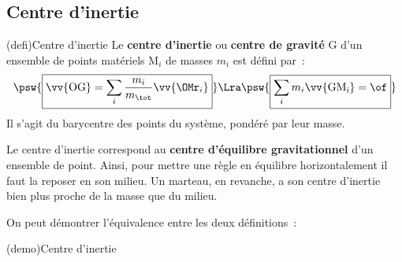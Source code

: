 \documentclass[../../main/main.tex]{subfiles}
\begin{document}
\subsection{Centre d'inertie}

\begin{tcb*}(defi){Centre d'inertie}
	Le \textbf{centre d'inertie} ou \textbf{centre de gravité} G d'un ensemble
	de points matériels M$_i$ de masses $m_i$ est défini par~:
	\[
		\psw{
			\boxed{\vv{\rm OG} = \sum_i \frac{m_i}{m_{\tot}} \vv{{\OMr}_i}}
		}
		\Lra
		\psw{
			\boxed{\sum_i m_i \vv{\rm GM_i} = \of }
		}
	\]
	Il s'agit du barycentre des points du système, pondéré par leur masse.
\end{tcb*}

Le centre d'inertie correspond au \textbf{centre d'équilibre gravitationnel}
d'un ensemble de point. Ainsi, pour mettre une règle en équilibre
horizontalement il faut la reposer en son milieu. Un marteau, en revanche, a son
centre d'inertie bien plus proche de la masse que du milieu.

On peut démontrer l'équivalence entre les deux définitions~:
\begin{tcb}(demo){Centre d'inertie}
\end{tcb}
\end{document}
